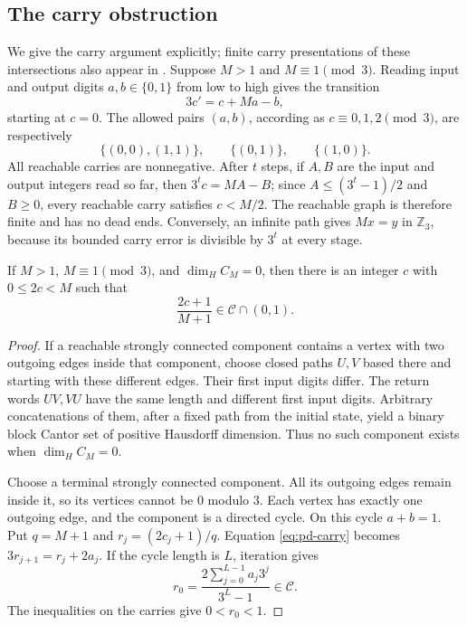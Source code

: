 \subsection{The carry obstruction}

We give the carry argument explicitly; finite carry presentations of
these intersections also appear in \cite{AL2014}.
Suppose $M>1$ and $M\equiv1\pmod3$. Reading input and output digits
$a,b\in\{0,1\}$ from low to high gives the transition
\begin{equation}\label{eq:pd-carry}
 3c'=c+Ma-b,
\end{equation}
starting at $c=0$. The allowed pairs $(a,b)$, according as
$c\equiv0,1,2\pmod3$, are respectively
\[
 \{(0,0),(1,1)\},\qquad\{(0,1)\},\qquad\{(1,0)\}.
\]
All reachable carries are nonnegative. After $t$ steps, if $A,B$ are
the input and output integers read so far, then $3^tc=MA-B$;
since $A\leq(3^t-1)/2$ and $B\geq0$, every reachable carry satisfies
$c<M/2$. The reachable graph is therefore finite and has no dead ends.
Conversely, an infinite path gives $Mx=y$ in $\mathbb Z_3$, because its
bounded carry error is divisible by $3^t$ at every stage.

\begin{lemma}\label{lem:pd-terminal}
If $M>1$, $M\equiv1\pmod3$, and $\dim_H C_M=0$, then there is an integer
$c$ with $0\leq2c<M$ such that
\[
 \frac{2c+1}{M+1}\in\mathcal C\cap(0,1).
\]
\end{lemma}
\begin{proof}
If a reachable strongly connected component contains a vertex with two
outgoing edges inside that component, choose closed paths $U,V$ based
there and starting with these different edges. Their first input digits
differ. The return words $UV,VU$ have the same length and different
first input digits. Arbitrary concatenations of them, after a fixed
path from the initial state, yield a binary block Cantor set of positive
Hausdorff dimension. Thus no such component exists when $\dim_H C_M=0$.

Choose a terminal strongly connected component. All its outgoing edges
remain inside it, so its vertices cannot be $0$ modulo $3$. Each vertex
has exactly one outgoing edge, and the component is a directed cycle.
On this cycle $a+b=1$. Put $q=M+1$ and $r_j=(2c_j+1)/q$. Equation
\eqref{eq:pd-carry} becomes $3r_{j+1}=r_j+2a_j$. If the cycle length is
$L$, iteration gives
\[
 r_0=\frac{2\sum_{j=0}^{L-1}a_j3^j}{3^L-1}\in\mathcal C.
\]
The inequalities on the carries give $0<r_0<1$.
\end{proof}

